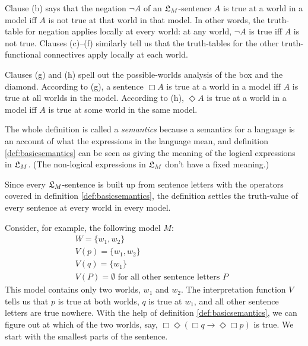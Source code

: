 Clause (b) says that the negation $\neg A$ of an $\mathfrak{L}_M$-sentence $A$ is true at
a world in a model iff $A$ is not true at that world in that model. In other
words, the truth-table for negation applies locally at every world: at any
world, $\neg A$ is true iff $A$ is not true.
Clauses (c)--(f) similarly tell us that the truth-tables for the other
truth-functional connectives apply locally at each world.

Clauses (g) and (h) spell out the possible-worlds analysis of the box and the
diamond. According to (g), a sentence $\Box A$ is true at a world in a model iff
$A$ is true at all worlds in the model. According to (h), $\Diamond A$ is true
at a world in a model iff $A$ is true at some world in the same model.

The whole definition is called a \emph{semantics} because a semantics for a
language is an account of what the expressions in the language mean, and
definition \ref{def:basicsemantics} can be seen as giving the meaning of the
logical expressions in $\mathfrak{L}_M$. (The non-logical expressions in $\mathfrak{L}_{M}$ don't
have a fixed meaning.)

Since every $\mathfrak{L}_M$-sentence is built up from sentence letters with the operators
covered in definition \ref{def:basicsemantics}, the definition settles the
truth-value of every sentence at every world in every model.

Consider, for example, the following model $M$:
%
\begin{gather*}
  W = \{ w_{1},w_{2} \}\\
  V(p) = \{ w_{1},w_{2} \}\\
  V(q) = \{ w_{1} \}\\
  V(P) = \emptyset \text{ for all other sentence letters $P$ }
\end{gather*}
This model contains only two worlds, $w_{1}$ and $w_{2}$. The interpretation
function $V$ tells us that $p$ is true at both worlds, $q$ is true at $w_{1}$,
and all other sentence letters are true nowhere. With the help of definition
\ref{def:basicsemantics}, we can figure out at which of the two worlds, say,
$\Box\Diamond(\Box q \to \Diamond\Box p)$ is true. We start with the smallest
parts of the sentence.

